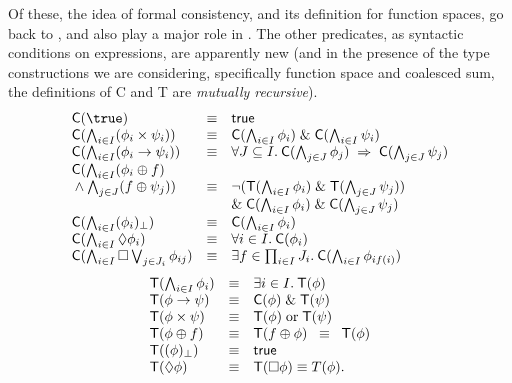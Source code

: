 Of these, the idea of formal consistency, and its definition for
function spaces, go back to \cite{Kre59}, and also play a major role in
\cite{Sco81,Sco82}.
The other predicates, as syntactic conditions on expressions, are
apparently new (and in the presence of the  type constructions
we are considering, specifically function space and coalesced sum,
the definitions of {\sf C} and {\sf T} are {\em mutually recursive}).
\[ \begin{array}{lll}
{\sf C}(\true ) & \equiv & {\sf true} \\
{\sf C}(\bigwedge_{i \in I}(\phi_{i} \times \psi_{i})) & \equiv & {\sf C}(\bigwedge_{i \in I}
\phi_{i}) \; \& \; {\sf C}(\bigwedge_{i \in I}\psi_{i}) \\
{\sf C}(\bigwedge_{i \in I}(\phi_{i} \rightarrow
\psi_{i})) & \equiv  & \forall J \subseteq I. \: 
{\sf C}
(\bigwedge_{j \in J}\phi_{j})
\; \Rightarrow \; {\sf C}(\bigwedge_{j \in J}\psi_{j}) \\
{\sf C}(\bigwedge_{i \in I}(\phi_{i} \oplus {\sl f}) & & \\
\mbox {} \wedge \bigwedge_{j \in J}({\sl f} \oplus \psi_{j})) & \equiv &
\neg ({\sf T}(\bigwedge_{i \in I}\phi_{i}) \; \& \; 
{\sf T}(\bigwedge_{j \in J}\psi_{j})) \\
& & \& \; {\sf C}(\bigwedge_{i \in I}\phi_{i}) \; \& \;
{\sf C}(\bigwedge_{j \in J}\psi_{j}) \\
{\sf C}(\bigwedge_{i \in I}(\phi_{i})_{\bot}) & \equiv & 
{\sf C}(\bigwedge_{i \in I}\phi_{i}) \\
{\sf C}(\bigwedge_{i \in I}\Diamond \phi_{i}) & \equiv & \forall i \in I. \:
{\sf C}(\phi_{i}) \\
{\sf C}(\bigwedge_{i \in I} \Box \bigvee_{j \in J_{i}} \phi_{ij}) & \equiv &
\exists f \in \prod_{i \in I} J_{i}. \: {\sf C}(\bigwedge_{i \in I} \phi_{i f(i)  } )
\end{array} \]
\[ \begin{array}{lll}
{\sf T}(\bigwedge_{i \in I}\phi_{i}) & \equiv & \exists i \in I. \: {\sf T}(\phi ) \\
{\sf T}(\phi \rightarrow \psi ) & \equiv & {\sf C}(\phi ) \; \& \; {\sf T}(\psi ) \\
{\sf T}(\phi \times \psi ) & \equiv & {\sf T}(\phi ) \; \mbox{or} \; {\sf T}(\psi ) \\
{\sf T}(\phi \oplus {\sl f}) & \equiv &
{\sf T}({\sl f} \oplus \phi ) \;\; \equiv \;\; {\sf T}(\phi ) \\
{\sf T}((\phi )_{\bot}) & \equiv & {\sf true} \\
{\sf T}(\Diamond \phi ) & \equiv & {\sf T}(\Box \phi ) \equiv T(\phi ) .
\end{array} \] 

